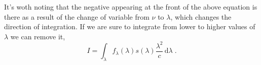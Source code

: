 \documentclass[12pt]{scrartcl}
\newcommand{\dx}[1]{\ensuremath{\,\mathrm{d}#1}}
\begin{document}
It's woth noting that the negative appearing at the front of the above equation
is there as a result of the change of variable from $\nu$ to $\lambda$, which
changes the direction of integration. If we are sure to integrate from lower to
higher values of $\lambda$ we can remove it,
\[ I = \int_\lambda f_\lambda(\lambda)s(\lambda)\frac{\lambda^2}{c}\dx{\lambda} \; . \]
\end{document}
